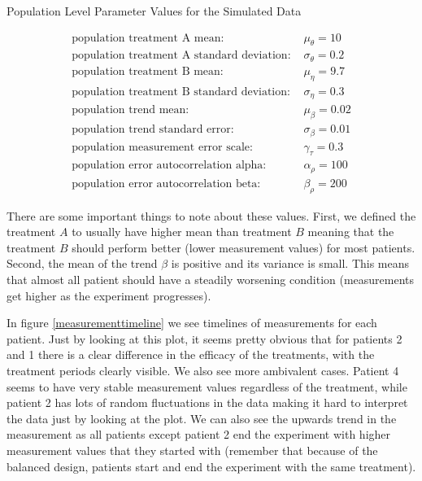 \documentclass[12pt,a4paper,leqno]{report}
\theoremstyle{plain}
\theoremstyle{definition}
\theoremstyle{remark}
\begin{document}
\begin{table}
    \caption{Population Level Parameter Values for the Simulated Data}
    \label{}
    \begin{align}\label{populationparameters}
        \text{population treatment A mean: } & \mu_{\theta} = 10 \nonumber \\
        \text{population treatment A standard deviation: } & \sigma_{\theta} = 0.2 \nonumber \\
        \text{population treatment B mean: } & \mu_{\eta} = 9.7 \nonumber \\
        \text{population treatment B standard deviation: } & \sigma_{\eta} = 0.3 \nonumber \\
        \text{population trend mean: } & \mu_{\beta} = 0.02 \nonumber \\
        \text{population trend standard error: } & \sigma_{\beta} = 0.01 \nonumber \\
        \text{population measurement error scale: } & \gamma_{\tau} = 0.3 \nonumber \\
        \text{population error autocorrelation alpha: } & \alpha_{\rho} = 100 \nonumber \\
        \text{population error autocorrelation beta: } & \beta_{\rho} = 200 \nonumber
    \end{align}
\end{table}

There are some important things to note about these values. First, we defined the
treatment \(A\) to usually have higher mean than treatment \(B\) meaning that the
treatment \(B\) should perform better (lower measurement values) for most patients.
Second, the mean of the trend \(\beta \) is positive and its variance is small. This means
that almost all patient should have a steadily worsening condition (measurements get
higher as the experiment progresses).

In figure \ref{measurementtimeline} we see timelines of measurements for each patient. Just by looking at this plot, it seems
pretty obvious that for patients 2 and 1 there is a clear difference in the efficacy of the
treatments, with the treatment periods clearly visible. We also see more ambivalent
cases. Patient 4 seems to have very stable measurement values regardless of the
treatment, while patient 2 has lots of random fluctuations in the data making it hard to
interpret the data just by looking at the plot. We can also see the upwards trend in the
measurement as all patients except patient 2 end the experiment with higher measurement values
that they started with (remember that because of the balanced design, patients start and
end the experiment with the same treatment).
\end{document}
